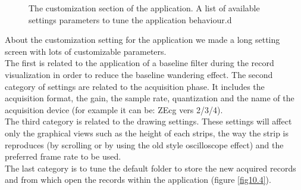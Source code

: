 \newpage
\begin{figure}[!htb]
	\centering
	\qquad 
	\caption{The customization section of the application. A list of available settings parameters to tune the application behaviour.d}  
	\label{fig10.10}
\end{figure}
About the customization setting  for the application we made a long setting screen with lots of customizable parameters.\\
The first is related to the application of a baseline filter during the record visualization in order to reduce the baseline wandering effect. The second category of settings are related to the acquisition phase. It includes the acquisition format, the gain, the sample rate, quantization and the name of the acquisition device (for example it can be: ZEcg vers 2/3/4).\\
The third category is related to the drawing settings. These settings will affect only the graphical views such as the height of each strips, the way the strip is reproduces (by scrolling or by using the old style oscilloscope effect) and the preferred frame rate to be used.\\
The last category is to tune the default folder to store the new acquired records and from which open the records within the application (figure \ref{fig10.4}).
